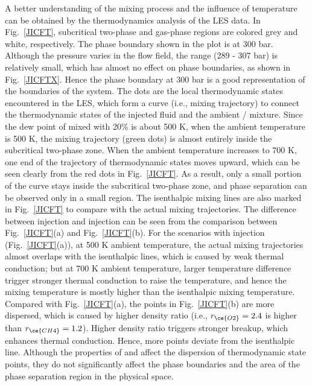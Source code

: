 A better understanding of the mixing process and the influence of temperature can be obtained by the thermodynamics analysis of the LES data. In Fig.~\ref{JICFT}, subcritical two-phase and gas-phase regions are colored grey and white, respectively. The phase boundary shown in the plot is at 300 bar. Although the pressure varies in the flow field, the range (289 - 307 bar) is relatively small, which has almost no effect on phase boundaries, as shown in Fig.~\ref{JICFTX}. Hence the phase boundary at 300 bar is a good representation of the boundaries of the system.  The dots are the local thermodynamic states encountered in the LES, which form a curve (i.e., mixing trajectory) to connect the thermodynamic states of the injected fluid and the ambient / mixture. Since the dew point of  mixed with 20\%  is about 500 K, when the ambient temperature is 500 K, the mixing trajectory (green dots) is almost entirely inside the subcritical two-phase zone. When the ambient temperature increases to 700 K, one end of the trajectory of thermodynamic states moves upward, which can be seen clearly from the red dots in Fig.~\ref{JICFT}. As a result, only a small portion of the curve stays inside the subcritical two-phase zone, and phase separation can be observed only in a small region. The isenthalpic mixing lines are also marked in Fig.~\ref{JICFT} to compare with the actual mixing trajectories. The difference between  injection and  injection can be seen from the comparison between Fig.~\ref{JICFT}(a) and Fig.~\ref{JICFT}(b). For the scenarios with  injection (Fig.~\ref{JICFT}(a)), at 500 K ambient temperature, the actual mixing trajectories almost overlaps with the isenthalpic lines, which is caused by weak thermal conduction; but at 700 K ambient temperature, larger temperature difference trigger stronger thermal conduction to raise the temperature, and hence the mixing temperature is mostly higher than the isenthalpic mixing temperature. %
Compared with Fig.~\ref{JICFT}(a), the points in Fig.~\ref{JICFT}(b) are more dispersed, which is caused by higher density ratio (i.e., $r_{\ce{O2}}=2.4$ is higher than $r_{\ce{CH4}}=1.2$). Higher density ratio triggers stronger breakup, which enhances thermal conduction. Hence, more points deviate from the isenthalpic line.
Although the properties of  and  affect the dispersion of thermodynamic state points, they do not significantly affect the phase boundaries and the area of the phase separation region in the physical space.

